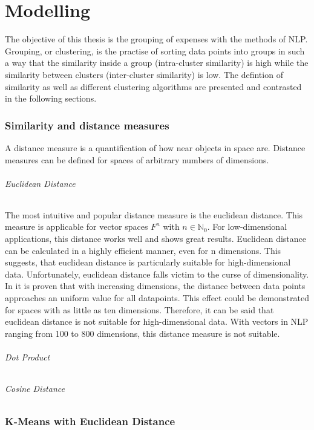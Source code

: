 \chapter{Modelling}
The objective of this thesis is the grouping of expenses with the methods of \ac{NLP}. Grouping, or clustering, is the practise of sorting data points into groups in such a way that the similarity inside a group (intra-cluster similarity) is high while the similarity between clusters (inter-cluster similarity) is low. The defintion of similarity as well as different clustering algorithms are presented and contrasted in the following sections.

\subsection{Similarity and distance measures}
A distance measure is a quantification of how near objects in space are. Distance measures can be defined for spaces of arbitrary numbers of dimensions. 



\subparagraph{Euclidean Distance} \label{euclidean}
The most intuitive and popular distance measure is the euclidean distance. This measure is applicable for vector spaces $F^{n}$ with $n \in \mathbb{N}_0 $. For low-dimensional applications, this distance works well and shows great results. Euclidean distance can be calculated in a highly efficient manner, even for n dimensions. This suggests, that euclidean distance is particularly suitable for high-dimensional data. Unfortunately, euclidean distance falls victim to the curse of dimensionality. In \cite{beyerNearestNeighbor} it is proven that with increasing dimensions, the distance between data points approaches an uniform value for all datapoints. This effect could be demonstrated for spaces with as little as ten dimensions. Therefore, it can be said that euclidean distance is not suitable for high-dimensional data. With vectors in \ac{NLP} ranging from 100 to 800 dimensions, this distance measure is not suitable.

\subparagraph{Dot Product}


\subparagraph{Cosine Distance}


\subsection{K-Means with Euclidean Distance}